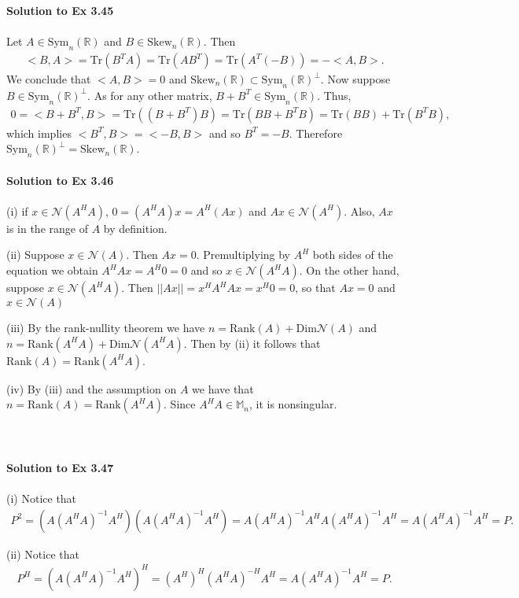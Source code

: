 \documentclass[letterpaper,12pt]{article}
\theoremstyle{definition}
\begin{document}
\begin{spacing}{1.3}{}
	\textbf{Solution to Ex 3.45} \\\\
	Let $A\in\text{Sym}_n(\mathbb R)$ and $B\in\text{Skew}_n(\mathbb R)$.
	Then
	\begin{align*}
	<B,A>=\text{Tr}(B^TA)=\text{Tr}(AB^T)=
	\text{Tr}(A^T(-B))=-<A,B>.
	\end{align*}
	We conclude that $<A,B>=0$ and $\text{Skew}_n(\mathbb R)\subset\text{Sym}_n(\mathbb R)^\perp$.
	Now suppose $B\in\text{Sym}_n(\mathbb R)^\perp$.
	As for any other matrix, $B+B^T\in\text{Sym}_n(\mathbb R)$.
	Thus,
	\begin{align*}
	0 = <B+B^T,B>=\text{Tr}((B+B^T)B) =\text{Tr}(BB + B^TB)=
	\text{Tr}(BB)+\text{Tr}(B^TB),
	\end{align*}
	which implies $<B^T,B>=<-B,B>$ and so $B^T=-B$.
	Therefore $\text{Sym}_n(\mathbb R)^\perp=\text{Skew}_n(\mathbb R)$. \\\\
	
	\textbf{Solution to Ex 3.46} \\\\
	(i)
	if $x\in\mathcal N(A^HA)$, $0=(A^HA)x=A^H(Ax)$ and $Ax\in\mathcal N(A^H)$.
	Also, $Ax$ is in the range of $A$ by definition.
	
	(ii)
	Suppose $x\in\mathcal N(A)$.
	Then $Ax=0$.
	Premultiplying by $A^H$ both sides of the equation we obtain $A^HAx=A^H0=0$
	and so $x\in\mathcal N(A^HA)$.
	On the other hand, suppose $x\in\mathcal N(A^HA)$.
	Then $||Ax||=x^HA^HAx=x^H0=0$, so that $Ax=0$ and $x\in\mathcal N(A)$
	
	(iii)
	By the rank-nullity theorem we have $n=\text{Rank}(A)+\text{Dim}\mathcal N(A)$
	and $n=\text{Rank}(A^HA)+\text{Dim}\mathcal N(A^HA)$.
	Then by (ii) it follows that $\text{Rank}(A)=\text{Rank}(A^HA)$.
	
	(iv)
	By (iii) and the assumption on $A$ we have that $n=\text{Rank}(A)=\text{Rank}(A^HA)$.
	Since $A^HA\in\mathbb M_n$, it is nonsingular.\\\\
	\\\\
	\textbf{Solution to Ex 3.47} \\\\
	(i)
	Notice that
	\begin{align*}
	P^2=(A(A^HA)^{-1}A^H)(A(A^HA)^{-1}A^H)=
	A(A^HA)^{-1}A^HA(A^HA)^{-1}A^H=
	A(A^HA)^{-1}A^H=P.
	\end{align*}
	
	(ii)
	Notice that
	\begin{align*}
	P^H=(A(A^HA)^{-1}A^H)^H=
	(A^H)^H(A^HA)^{-H}A^H=A(A^HA)^{-1}A^H=P.
	\end{align*}
	

\end{spacing}
\end{document}
